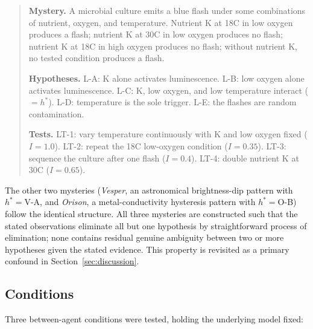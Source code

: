 \documentclass[11pt]{article}
\begin{document}
\begin{quote}
\small
\textbf{Mystery.} A microbial culture emits a blue flash under some combinations of nutrient,
oxygen, and temperature. Nutrient K at 18\textdegree{}C in low oxygen produces a flash; nutrient K
at 30\textdegree{}C in low oxygen produces no flash; nutrient K at 18\textdegree{}C in high oxygen
produces no flash; without nutrient K, no tested condition produces a flash.

\textbf{Hypotheses.} L-A: K alone activates luminescence. L-B: low oxygen alone activates
luminescence. L-C: K, low oxygen, and low temperature interact ($=h^\ast$). L-D: temperature is
the sole trigger. L-E: the flashes are random contamination.

\textbf{Tests.} LT-1: vary temperature continuously with K and low oxygen fixed ($I=1.0$). LT-2:
repeat the 18\textdegree{}C low-oxygen condition ($I=0.35$). LT-3: sequence the culture after one
flash ($I=0.4$). LT-4: double nutrient K at 30\textdegree{}C ($I=0.65$).
\end{quote}

The other two mysteries (\emph{Vesper}, an astronomical brightness-dip pattern with $h^\ast=$V-A,
and \emph{Orison}, a metal-conductivity hysteresis pattern with $h^\ast=$O-B) follow the identical
structure. All three mysteries are constructed such that the stated observations eliminate all but
one hypothesis by straightforward process of elimination; none contains residual genuine ambiguity
between two or more hypotheses given the stated evidence. This property is revisited as a primary
confound in Section~\ref{sec:discussion}.

\subsection{Conditions}

Three between-agent conditions were tested, holding the underlying model fixed:
\end{document}
